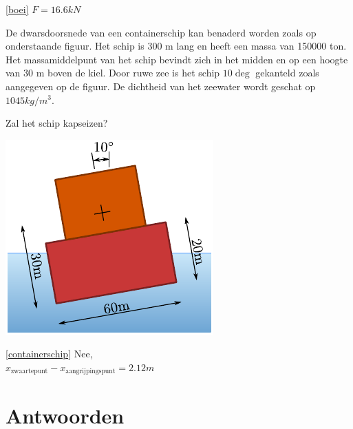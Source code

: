 \begin{antwoord}{\ref{boei}}
	$F = 16.6 \unit{kN}$
\end{antwoord}
\begin{toepassing}
	\label{containerschip}
De dwarsdoorsnede van een containerschip kan benaderd worden zoals op onderstaande figuur. Het schip is 300 m lang en heeft een massa van 150000 ton. Het massamiddelpunt van het schip bevindt zich in het midden en op een hoogte van 30 m boven de kiel. Door ruwe zee is het schip $10\deg$ gekanteld zoals aangegeven op de figuur. De dichtheid van het zeewater wordt geschat op $1045 \unit{kg/m^3}$.
		
Zal het schip kapseizen?
		
	\centering
	\includegraphics{fig/hydrostatica/containerschip}
\end{toepassing}
\begin{antwoord}{\ref{containerschip}}
	Nee,\\ $x_\text{zwaartepunt}-x_\text{aangrijpingspunt} = 2.12 \unit{m}$
\end{antwoord}
	
\section*{Antwoorden}
	\begin{multicols}{2}
	\end{multicols}